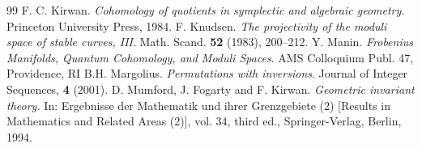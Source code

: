 \documentclass[11pt,letterpaper]{amsart}
\numberwithin{equation}{section}
\theoremstyle{definition}
\begin{document}
\begin{thebibliography}{99}
     F. C. Kirwan. {\em Cohomology of quotients in symplectic and algebraic geometry.} Princeton University Press, 1984.
	 F. Knudsen. {\em The projectivity of the moduli space of stable curves, III}. Math. Scand. \textbf{52} (1983), 200--212.
     Y. Manin. {\em Frobenius Manifolds, Quantum Cohomology, and Moduli Spaces}. AMS Colloquium Publ. 47, Providence, RI
     B.H. Margolius. {\em Permutations with inversions}. Journal of Integer Sequences, \textbf{4} (2001).
     D. Mumford, J. Fogarty and F. Kirwan. {\em Geometric invariant theory.} In: Ergebnisse der Mathematik und ihrer Grenzgebiete (2) [Results in Mathematics and Related Areas (2)], vol. 34, third ed., Springer-Verlag, Berlin, 1994.
\end{thebibliography}
\end{document}
